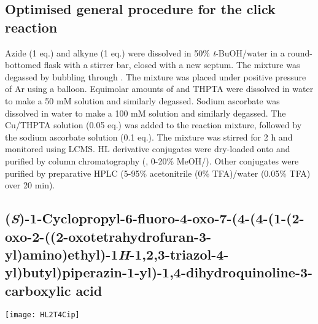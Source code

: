 \subsection{Optimised general procedure for the click reaction \label{sec:click_general}}

Azide (1 eq.) and alkyne (1 eq.) were dissolved in 50\% \textit{t}-BuOH/water in a round-bottomed flask with a stirrer bar, closed with a new septum. The mixture was degassed by bubbling through . The mixture was placed under positive pressure of Ar using a balloon. 
Equimolar amounts of  and THPTA  were dissolved in water to make a 50 mM solution and similarly degassed.
Sodium ascorbate was dissolved in water to make a 100 mM solution and similarly degassed.
The Cu/THPTA solution (0.05 eq.) was added to the reaction mixture, followed by the sodium ascorbate solution (0.1 eq.). The mixture was stirred for 2 h and monitored using LCMS.
HL derivative conjugates were dry-loaded onto  and purified by column chromatography (, 0-20\% MeOH/).
Other conjugates were purified by preparative HPLC (5-95\% acetonitrile (0\% TFA)/water (0.05\% TFA) over 20 min).

\subsection{(\textit{S})-1-Cyclopropyl-6-fluoro-4-oxo-7-(4-(4-(1-(2-oxo-2-((2-oxotetrahydrofuran\hyp{}3\hyp{}yl)amino)ethyl)-1\textit{H}-1,2,3-triazol-4-yl)butyl)piperazin-1-yl)-1,4-dihydroqui\allowbreak n\allowbreak oline-3-carboxylic acid }
	
	
	\begin{scheme}[H]
		\begin{center}
			\texttt{[image: HL2T4Cip]}
		\end{center}
	\end{scheme}

